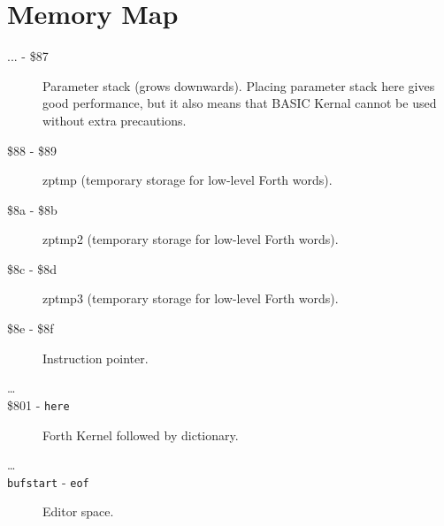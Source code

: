 \chapter{Memory Map}

\begin{description}
\item[... - \$87] Parameter stack (grows downwards). Placing parameter stack here gives good performance, but it also means that BASIC Kernal cannot be used without extra precautions.
\item[\$88 - \$89] zptmp (temporary storage for low-level Forth words).
\item[\$8a - \$8b] zptmp2 (temporary storage for low-level Forth words).
\item[\$8c - \$8d] zptmp3 (temporary storage for low-level Forth words).
\item[\$8e - \$8f] Instruction pointer.
\item[\ldots]
\item[\$801 - \texttt{here}] Forth Kernel followed by dictionary.
\item[\ldots]
\item[\texttt{bufstart} - \texttt{eof}] Editor space.
\end{description}


